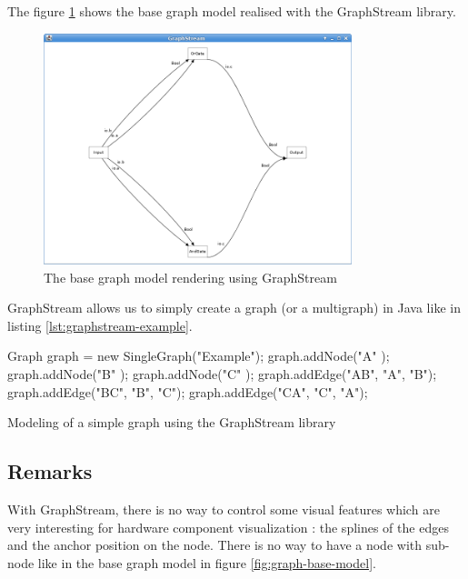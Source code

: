 The figure \ref{fig:base-graph-model-graphstream} shows the base graph model
realised with the GraphStream library.

\begin{figure}[H]
  \centering
  \includegraphics[width=0.8\textwidth]{img/graphstream-base-model-example}
  \caption{The base graph model rendering using GraphStream}
  \label{fig:base-graph-model-graphstream}
\end{figure}

GraphStream allows us to simply create a graph (or a multigraph) in Java like in
listing \ref{lst:graphstream-example}.

\begin{listing}[H]
  \centering
  \begin{javacode}
  Graph graph = new SingleGraph("Example");
  graph.addNode("A" );
  graph.addNode("B" );
  graph.addNode("C" );
  graph.addEdge("AB", "A", "B");
  graph.addEdge("BC", "B", "C");
  graph.addEdge("CA", "C", "A");
  \end{javacode}
  \caption[A simple graph modelisation using GraphStream]{Modeling of a
    simple graph using the GraphStream library}
  \label{lst:graphstream-example}
\end{listing}

\subsection{Remarks}
\label{sub:Remarks}

With GraphStream, there is no way to control some visual features which are very
interesting for hardware component visualization : the splines of the edges and
the anchor position on the node. There is no way to have a node with sub-node
like in the base graph model in figure \ref{fig:graph-base-model}.

